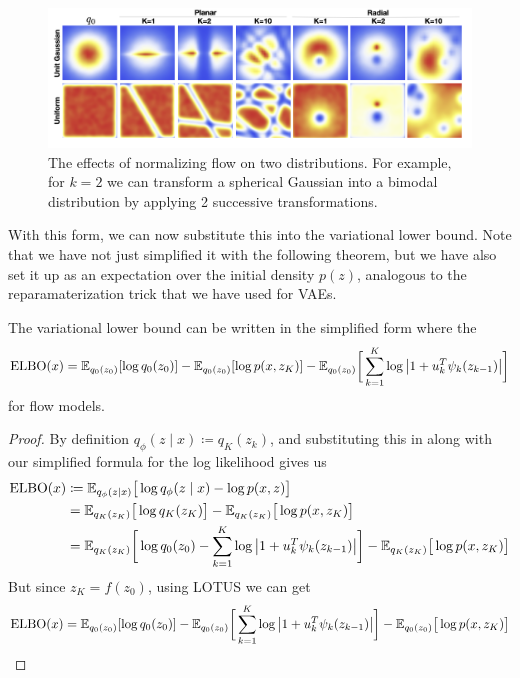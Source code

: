   \begin{figure}[H]
    \centering 
    \includegraphics[scale=0.4]{img/contractions.png}
    \caption{The effects of normalizing flow on two distributions. For example, for $k=2$ we can transform a spherical Gaussian into a bimodal distribution by applying 2 successive transformations. } 
    \label{fig:contractions}
  \end{figure} 

  With this form, we can now substitute this into the variational lower bound. Note that we have not just simplified it with the following theorem, but we have also set it up as an expectation over the initial density $p(z)$, analogous to the reparamaterization trick that we have used for VAEs. 

  \begin{theorem}
    The variational lower bound can be written in the simplified form where the 
    \begin{equation}
      \elbo(x) = \mathbb{E}_{q_0 (z_0)} [ \log q_0 (z_0)] - \mathbb{E}_{q_0 (z_0)} [ \log p(x, z_K)] - \mathbb{E}_{q_0 (z_0)} \bigg[ \sum_{k=1}^K \log \big| 1 + u_k^T \psi_k (z_{k-1}) \big| \bigg]
    \end{equation}
    for flow models. 
  \end{theorem}
  \begin{proof}
    By definition $q_\phi(z \mid x) \coloneqq q_K (z_k)$, and substituting this in along with our simplified formula for the log likelihood gives us 
    \begin{align}
      \elbo(x) & \coloneqq \mathbb{E}_{q_\phi (z \mid x)} \big[ \log q_\phi (z \mid x) - \log p(x, z) \big] \\
               & = \mathbb{E}_{q_K (z_K)} \big[ \log q_K (z_K) \big] - \mathbb{E}_{q_K (z_K)} \big[ \log p(x, z_K) \big]  \\ 
               & = \mathbb{E}_{q_K (z_K)}  \bigg[ \log q_0 (z_0) - \sum_{k=1}^K \log \big| 1 + u_k^T \psi_k (z_{k-1}) \big| \bigg] - \mathbb{E}_{q_K (z_K)} \big[ \log p(x, z_K) \big] 
    \end{align}
    But since $z_K = f(z_0)$, using LOTUS we can get 
    \begin{equation}
      \elbo(x) = \mathbb{E}_{q_0 (z_0)} [\log q_0 (z_0)] - \mathbb{E}_{q_0 (z_0)}  \bigg[ \sum_{k=1}^K \log \big| 1 + u_k^T \psi_k (z_{k-1}) \big| \bigg] - \mathbb{E}_{q_0 (z_0)} \big[ \log p(x, z_K) \big] 
    \end{equation}
  \end{proof} 

